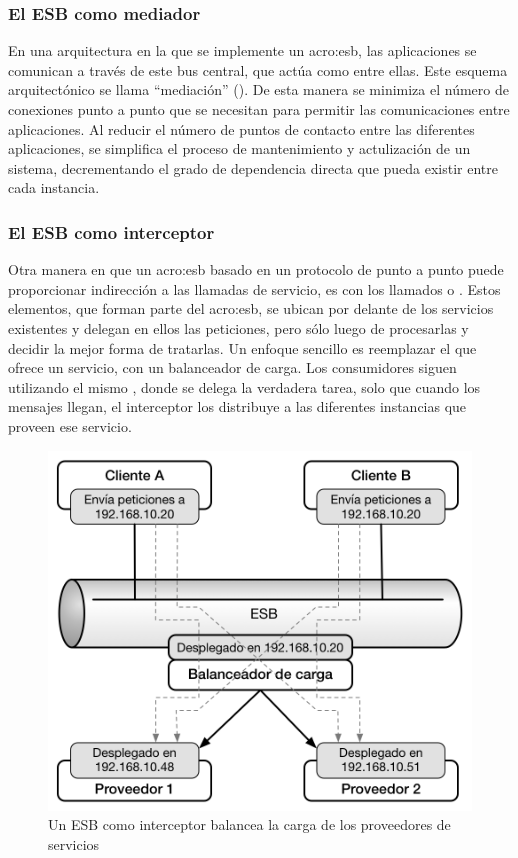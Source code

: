 \subsubsection{El ESB como mediador}

En una arquitectura en la que se implemente un \gls{acro:esb}, las aplicaciones se comunican a través de este bus central, que actúa como  entre ellas. Este esquema arquitectónico se llama ``mediación'' (). De esta manera se minimiza el número de conexiones punto a punto que se necesitan para permitir las comunicaciones entre aplicaciones. Al reducir el número de puntos de contacto entre las diferentes aplicaciones, se simplifica el proceso de mantenimiento y actulización de un sistema, decrementando el grado de dependencia directa que pueda existir entre cada instancia.


\subsubsection{El ESB como interceptor}

Otra manera en que un \gls{acro:esb} basado en un protocolo de punto a punto puede proporcionar indirección a las llamadas de servicio, es con los llamados  o . Estos elementos, que forman parte del \gls{acro:esb}, se ubican por delante de los servicios existentes y delegan en ellos las peticiones, pero sólo luego de procesarlas y decidir la mejor forma de tratarlas. Un enfoque sencillo es reemplazar el  que ofrece un servicio, con un balanceador de carga. Los consumidores siguen utilizando el mismo , donde se delega la verdadera tarea, solo que cuando los mensajes llegan, el interceptor los distribuye a las diferentes instancias que proveen ese servicio\cite[p.~52]{josuttis2007}.

\begin{figure}[H]
  \includegraphics[width=\linewidth]{src/images/02-capitulo-2/esb-interceptor.png}
  \caption{Un ESB como interceptor balancea la carga de los proveedores de servicios}
  \label{fig:esb-interceptors-load-balancer}
\end{figure}
